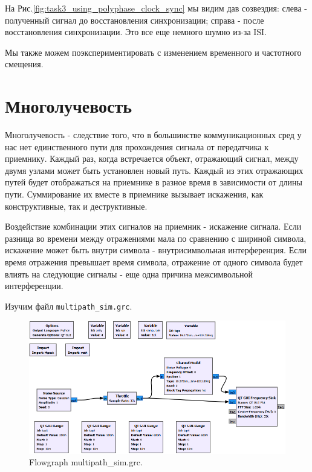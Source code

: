\documentclass[a4paper, 14pt]{extarticle}
\begin{document}
    На Рис.\ref{fig:task3_using_polyphase_clock_sync} мы видим дав созвездия: слева - полученный сигнал до
    восстановления синхронизации; справа - после восстановления синхронизации.
    Это все еще немного шумно из-за ISI.

    Мы также можем поэкспериментировать с изменением временного и частотного смещения.

    \newpage

    \section{Многолучевость}
    \label{sec:task4}

    Многолучевость - следствие того, что в большинстве коммуникационных сред у нас нет единственного
    пути для прохождения сигнала от передатчика к приемнику.
    Каждый раз, когда встречается объект, отражающий сигнал, между двумя узлами может быть установлен новый путь.
    Каждый из этих отражающих путей будет отображаться на приемнике в разное время в зависимости от длины
    пути. Суммирование их вместе в приемнике вызывает искажения, как конструктивные, так и деструктивные.

    Воздействие комбинации этих сигналов на приемник - искажение сигнала.
    Если разница во времени между отражениями мала по сравнению с шириной символа, искажение может быть
    внутри символа - внутрисимвольная интерференция.
    Если время отражения превышает время символа, отражение от одного символа будет влиять на следующие
    сигналы - еще одна причина межсимвольной интерференции.

    Изучим файл \texttt{multipath\_sim.grc}.

    \begin{figure}[h]
        \centering
        \includegraphics[width=0.9\linewidth]{resources/Images/task4_multipath_sim}
        \caption{Flowgraph multipath\_sim.grc.}
        \label{fig:task4_multipath_sim}
    \end{figure}
\end{document}

